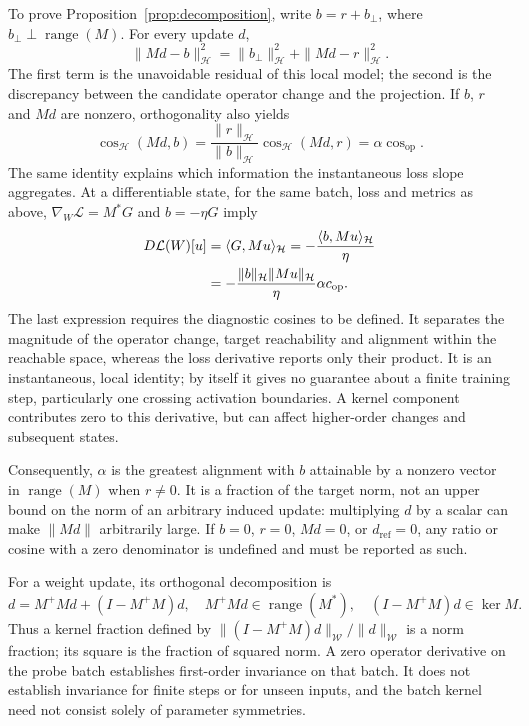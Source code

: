 \documentclass{article}
\theoremstyle{definition}
\theoremstyle{remark}
\begin{document}
To prove Proposition~\ref{prop:decomposition}, write $b=r+b_\perp$, where $b_\perp\perp\operatorname{range}(M)$. For every update $d$,
\begin{equation}
 \|Md-b\|_{\mathcal H}^2
 =\|b_\perp\|_{\mathcal H}^2+\|Md-r\|_{\mathcal H}^2.
 \label{eq:app-pythagoras}
\end{equation}
The first term is the unavoidable residual of this local model; the second is the discrepancy between the candidate operator change and the projection. If $b$, $r$ and $Md$ are nonzero, orthogonality also yields
\begin{equation}
 \cos_{\mathcal H}(Md,b)
 =\frac{\|r\|_{\mathcal H}}{\|b\|_{\mathcal H}}
    \cos_{\mathcal H}(Md,r)
 =\alpha\cos_{\mathrm{op}}.
 \label{eq:app-angle}
\end{equation}
The same identity explains which information the instantaneous loss slope aggregates. At a differentiable state, for the same batch, loss and metrics as above, $\nabla_W\mathcal L=M^*G$ and $b=-\eta G$ imply
\begin{equation}
 \begin{aligned}
 D\mathcal L(W)[u]
 &=\langle G,Mu\rangle_{\mathcal H}
 =-\frac{\langle b,Mu\rangle_{\mathcal H}}{\eta}\\
 &=-\frac{\|b\|_{\mathcal H}\|Mu\|_{\mathcal H}}{\eta}
       \alpha c_{\rm op}.
 \end{aligned}
 \label{eq:app-loss-slope}
\end{equation}
The last expression requires the diagnostic cosines to be defined. It separates the magnitude of the operator change, target reachability and alignment within the reachable space, whereas the loss derivative reports only their product. It is an instantaneous, local identity; by itself it gives no guarantee about a finite training step, particularly one crossing activation boundaries. A kernel component contributes zero to this derivative, but can affect higher-order changes and subsequent states.

Consequently, $\alpha$ is the greatest alignment with $b$ attainable by a nonzero vector in $\operatorname{range}(M)$ when $r\ne0$. It is a fraction of the target norm, not an upper bound on the norm of an arbitrary induced update: multiplying $d$ by a scalar can make $\|Md\|$ arbitrarily large. If $b=0$, $r=0$, $Md=0$, or $d_{\mathrm{ref}}=0$, any ratio or cosine with a zero denominator is undefined and must be reported as such.

For a weight update, its orthogonal decomposition is
\begin{equation}
 d=M^+Md+(I-M^+M)d,
 \quad
 M^+Md\in\operatorname{range}(M^*),
 \quad
 (I-M^+M)d\in\ker M.
 \label{eq:app-kernel}
\end{equation}
Thus a kernel fraction defined by
$\|(I-M^+M)d\|_{\mathcal W}/\|d\|_{\mathcal W}$
is a norm fraction; its square is the fraction of squared norm. A zero operator derivative on the probe batch establishes first-order invariance on that batch. It does not establish invariance for finite steps or for unseen inputs, and the batch kernel need not consist solely of parameter symmetries.
\end{document}
